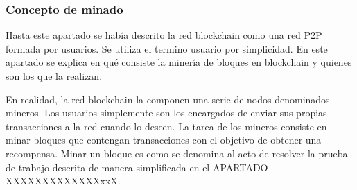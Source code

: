 \subsubsection{Concepto de minado}
Hasta este apartado se había descrito la red blockchain como una red P2P formada por usuarios. Se utiliza el termino usuario por simplicidad. En este apartado se explica en qué consiste la minería de bloques en blockchain y quienes son los que la realizan. \newline

En realidad, la red blockchain la componen una serie de nodos denominados mineros. Los usuarios simplemente son los encargados de enviar sus propias transacciones a la red cuando lo deseen. La tarea de los mineros consiste en minar bloques que contengan transacciones con el objetivo de obtener una recompensa. Minar un bloque es como se denomina al acto de resolver la prueba de trabajo descrita de manera simplificada en el APARTADO XXXXXXXXXXXXXxxX.


